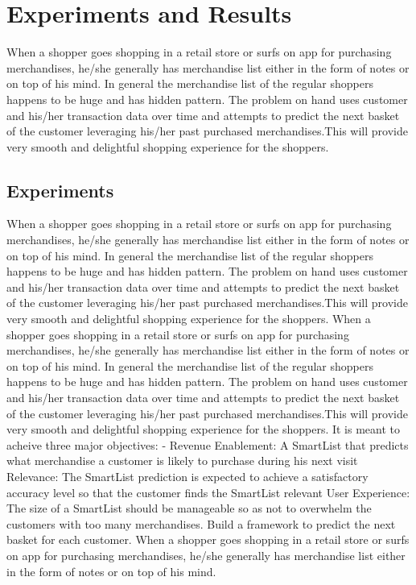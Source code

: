 \section{Experiments and Results}

When a shopper goes shopping in a retail store or surfs on app for purchasing merchandises, 
he/she generally has merchandise list either in the form of notes or on top of his mind. 
In general the merchandise list of the regular shoppers happens to be huge and has hidden pattern. 
The problem on hand uses customer and his/her transaction data over time and attempts to predict 
the next basket of the customer leveraging his/her past purchased merchandises.This will provide 
very smooth and delightful shopping experience for the shoppers.

\subsection{Experiments}
When a shopper goes shopping in a retail store or surfs on app for purchasing merchandises, 
he/she generally has merchandise list either in the form of notes or on top of his mind. 
In general the merchandise list of the regular shoppers happens to be huge and has hidden pattern. 
The problem on hand uses customer and his/her transaction data over time and attempts to predict 
the next basket of the customer leveraging his/her past purchased merchandises.This will provide 
very smooth and delightful shopping experience for the shoppers.
When a shopper goes shopping in a retail store or surfs on app for purchasing merchandises, 
he/she generally has merchandise list either in the form of notes or on top of his mind. 
In general the merchandise list of the regular shoppers happens to be huge and has hidden pattern. 
The problem on hand uses customer and his/her transaction data over time and attempts to predict 
the next basket of the customer leveraging his/her past purchased merchandises.This will provide 
very smooth and delightful shopping experience for the shoppers. It is meant to acheive three major 
objectives: - Revenue Enablement: A SmartList that predicts what merchandise a customer is likely to 
purchase during his next visit Relevance: The SmartList prediction is expected to achieve a 
satisfactory accuracy level so that the customer finds the SmartList relevant User Experience: 
The size of a SmartList should be manageable so as not to overwhelm the customers with too many 
merchandises. Build a framework to predict the next basket for each customer.
When a shopper goes shopping in a retail store or surfs on app for purchasing merchandises, 
he/she generally has merchandise list either in the form of notes or on top of his mind. 

